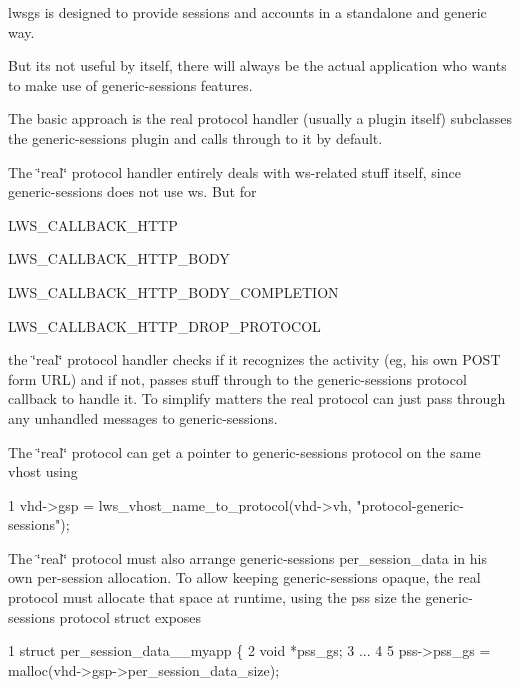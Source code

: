 lwsgs is designed to provide sessions and accounts in a standalone and generic way.

But it\textquotesingle{}s not useful by itself, there will always be the actual application who wants to make use of generic-\/sessions features.

The basic approach is the \textquotesingle{}real\textquotesingle{} protocol handler (usually a plugin itself) subclasses the generic-\/sessions plugin and calls through to it by default.

The \char`\"{}real\char`\"{} protocol handler entirely deals with ws-\/related stuff itself, since generic-\/sessions does not use ws. But for


\begin{DoxyItemize}
\item L\+W\+S\+\_\+\+C\+A\+L\+L\+B\+A\+C\+K\+\_\+\+H\+T\+TP
\item L\+W\+S\+\_\+\+C\+A\+L\+L\+B\+A\+C\+K\+\_\+\+H\+T\+T\+P\+\_\+\+B\+O\+DY
\item L\+W\+S\+\_\+\+C\+A\+L\+L\+B\+A\+C\+K\+\_\+\+H\+T\+T\+P\+\_\+\+B\+O\+D\+Y\+\_\+\+C\+O\+M\+P\+L\+E\+T\+I\+ON
\item L\+W\+S\+\_\+\+C\+A\+L\+L\+B\+A\+C\+K\+\_\+\+H\+T\+T\+P\+\_\+\+D\+R\+O\+P\+\_\+\+P\+R\+O\+T\+O\+C\+OL
\end{DoxyItemize}

the \char`\"{}real\char`\"{} protocol handler checks if it recognizes the activity (eg, his own P\+O\+ST form U\+RL) and if not, passes stuff through to the generic-\/sessions protocol callback to handle it. To simplify matters the real protocol can just pass through any unhandled messages to generic-\/sessions.

The \char`\"{}real\char`\"{} protocol can get a pointer to generic-\/sessions protocol on the same vhost using


\begin{DoxyCode}
1 vhd->gsp = lws\_vhost\_name\_to\_protocol(vhd->vh, "protocol-generic-sessions");
\end{DoxyCode}


The \char`\"{}real\char`\"{} protocol must also arrange generic-\/sessions per\+\_\+session\+\_\+data in his own per-\/session allocation. To allow keeping generic-\/sessions opaque, the real protocol must allocate that space at runtime, using the pss size the generic-\/sessions protocol struct exposes


\begin{DoxyCode}
1 struct per\_session\_data\_\_myapp \{
2         void *pss\_gs;
3 ...
4 
5         pss->pss\_gs = malloc(vhd->gsp->per\_session\_data\_size);
\end{DoxyCode}


